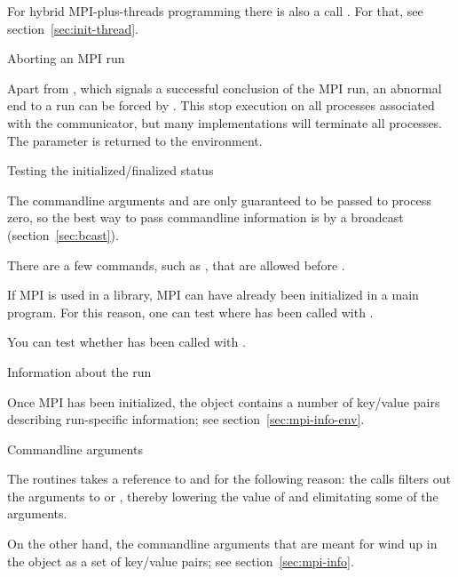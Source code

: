 \begin{remark}
  For hybrid MPI-plus-threads programming there is also a call
  . For that, see
  section~\ref{sec:init-thread}.
\end{remark}

 {Aborting an MPI run}

Apart from , which signals a successful
conclusion of the MPI run, an abnormal end to a run can be forced by
.
%
This stop execution on all processes associated with the communicator,
but many implementations will terminate all processes. The  parameter
is returned to the environment.


 {Testing the initialized/finalized status}

The commandline arguments  and  are only guaranteed to
be passed to process zero, so the best way to pass commandline information
is by a broadcast (section~\ref{sec:bcast}).

There are a few commands, such as
, that are allowed before
.

If MPI is used in a library, MPI can have already been initialized in a main program.
For this reason, one can test where  has been called with
%
.

You can test whether  has been called with
%
.

 {Information about the run}

Once MPI has been initialized, the  object
contains a number of key/value pairs describing run-specific
information; see section~\ref{sec:mpi-info-env}.

 {Commandline arguments}

The  routines takes a reference to 
and  for the following reason: the  calls
filters out the arguments to  or ,
thereby lowering the value of  and elimitating some of the 
arguments.

On the other hand, the commandline arguments that are meant for 
wind up in the  object as a set of
key/value pairs; see section~\ref{sec:mpi-info}.


